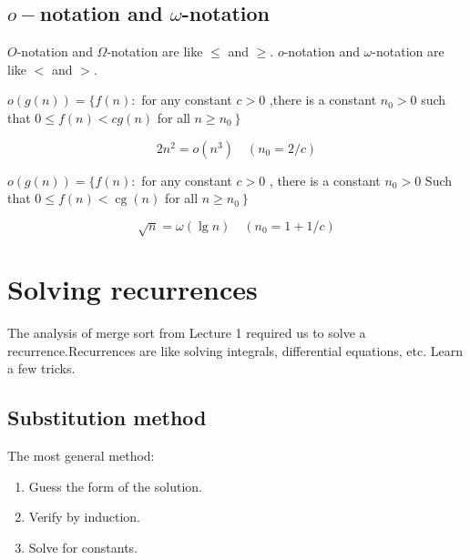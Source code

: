 \documentclass[11pt,toc=twocol]{elegantbook}
\begin{document}
\subsection{$o-$notation and $\omega$-notation}
$O$-notation and $\Omega$-notation are like $\leq$ and $\geq$. $o$-notation and $\omega$-notation are like $<$ and $>$.
\begin{definition}[$o-$notation]
  $o(g(n))=\{f(n):$ for any constant $c>0$ ,there is a constant $n_{0}>0$ such that $0 \leq f(n)<c g(n)$ for all $\left.n \geq n_{0}\right\}$ 
\end{definition}
\begin{example}
  $$
2 n^{2}=o\left(n^{3}\right) \quad\left(n_{0}=2 / c\right)
$$
\end{example}
\begin{definition}
  $o(g(n))=\{f(n):$ for any constant $c>0$ , there is a constant $n_{0}>0$
  Such that $0 \leq f(n)<\operatorname{cg}(n)$
  for all $\left.n \geq n_{0}\right\}$
\end{definition}
\begin{example}
  $$
  \sqrt{n}=\omega(\lg n) \quad\left(n_{0}=1+1 / c\right)
  $$
\end{example}
\section{Solving recurrences}

The analysis of merge sort from Lecture 1 required us to solve a recurrence.Recurrences are like solving integrals, differential equations, etc. Learn a few tricks.

\subsection{Substitution method}
\begin{definition}
  The most general method:
  \begin{enumerate}
    \item Guess the form of the solution.
    \item Verify by induction.
    \item Solve for constants.
  \end{enumerate} 
\end{definition}
\end{document}
